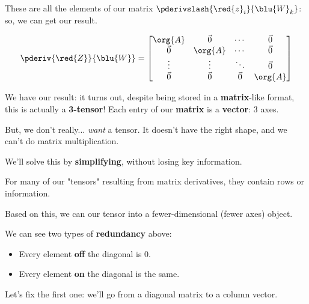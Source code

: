         These are all the elements of our matrix $\pderivslash{ \red{z}_i }{ \blu{W}_{k} }$: so, we can get our result.
        
        \begin{equation}
            \pderiv{ \red{Z} }{ \blu{W} } 
            =
            \begin{bmatrix}
                \org{A} & \vec{0} & \cdots  & \vec{0} \\
                \vec{0} & \org{A} & \cdots  & \vec{0} \\
                \vdots  & \vdots  & \ddots  & \vec{0} \\
                \vec{0} & \vec{0} & \vec{0} & \org{A}
            \end{bmatrix}
        \end{equation}
        
        We have our result: it turns out, despite being stored in a \textbf{matrix}-like format, this is actually a \textbf{3-tensor}! Each entry of our \textbf{matrix} is a \textbf{vector}: 3 axes.
        
        \subsecdiv
        
        But, we don't really... \textit{want} a tensor. It doesn't have the right shape, and we can't do matrix multiplication.
        
        We'll solve this by \textbf{simplifying}, without losing key information.\\

        \begin{concept}
            For many of our "tensors" resulting from matrix derivatives, they contain  rows or  information. 
            
            Based on this, we can  our tensor into a fewer-dimensional (fewer axes) object.
        \end{concept}
        
        We can see two types of \textbf{redundancy} above:
        
        \begin{itemize}
            \item Every element \textbf{off} the diagonal is 0.
            \item Every element \textbf{on} the diagonal is the same.
        \end{itemize}
        
        Let's fix the first one: we'll go from a diagonal matrix to a column vector.
        
